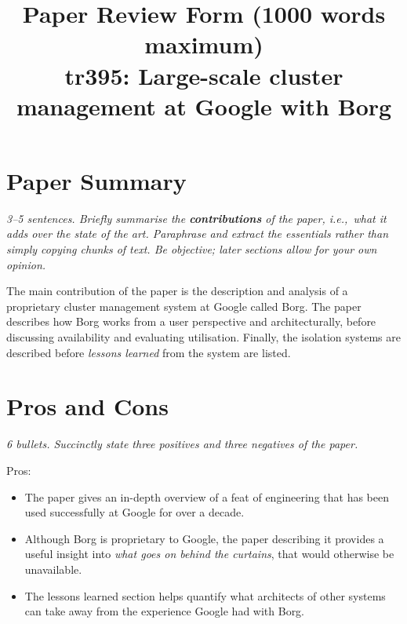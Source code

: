 \documentclass[11pt]{article}
\begin{document}

\title{Paper Review Form (1000 words maximum)\\
    tr395: Large-scale cluster management at Google with Borg \cite{Borg}}

\maketitle

\section*{Paper Summary}

\textsl{3--5 sentences. Briefly summarise the {\bf contributions} of the paper,
i.e.,~what it adds over the state of the art. Paraphrase and extract the
essentials rather than simply copying chunks of text. Be objective; later
sections allow for your own opinion.}

The main contribution of the paper is the description and analysis of a
proprietary cluster management system at Google called Borg. The paper
describes how Borg works from a user perspective and architecturally, before
discussing availability and evaluating utilisation. Finally, the isolation
systems are described before \textit{lessons learned} from the system are
listed.

\section*{Pros and Cons}

\textsl{6 bullets. Succinctly state three positives and three negatives of the
paper.}

Pros:

\begin{itemize}

    \item The paper gives an in-depth overview of a feat of engineering that has
    been used successfully at Google for over a decade.

    \item Although Borg is proprietary to Google, the paper describing it
    provides a useful insight into \textit{what goes on behind the curtains},
    that would otherwise be unavailable.

    \item The lessons learned section helps quantify what architects of other
    systems can take away from the experience Google had with Borg.

\end{itemize}
\end{document}

